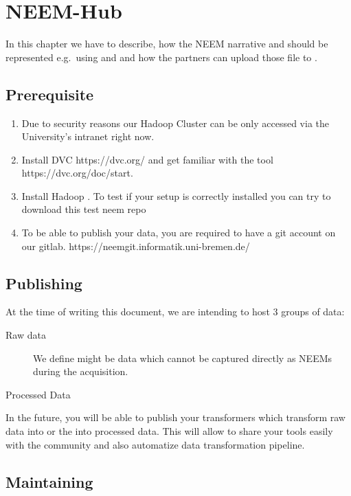 \chapter{NEEM-Hub}
\label{ch:neemhub}


In this chapter we have to describe, how the NEEM narrative and \neemexp should be represented e.g.\ using \owl and \mongodb and how the partners can upload those file to \openease.

\section{Prerequisite}
\begin{enumerate}
	\item Due to security reasons our Hadoop Cluster can be only accessed via the University's intranet right now.	
	\item Install DVC https://dvc.org/ and get familiar with the tool https://dvc.org/doc/start.
	\item Install Hadoop . 
			To test if your setup is correctly installed you can try to download this test neem repo
	\item To be able to publish your data, you are required to have a git account on our gitlab.
	https://neemgit.informatik.uni-bremen.de/
\end{enumerate}


\section{Publishing}
At the time of writing this document, we are intending to host 3 groups of data:
\begin{description}
	\item[Raw data]
		We define might be data which cannot be captured directly as NEEMs during the acquisition.
	\item[\neems] 
	\item[Processed Data]
\end{description}

In the future, you will be able to publish your transformers which transform raw data into \neems or the \neems into processed data.
This will allow to share your tools easily with the community and also automatize data transformation pipeline.

\section{Maintaining}
